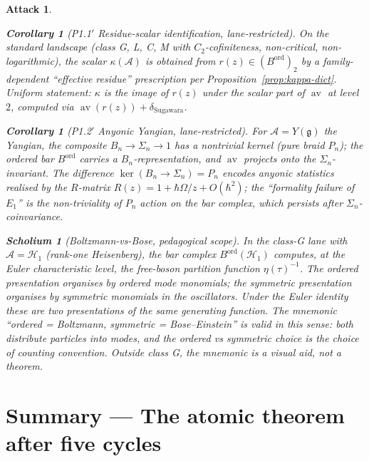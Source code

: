\documentclass[11pt]{article}
\newtheorem{corollary}[theorem]{Corollary}
\newtheorem{scholium}[theorem]{Scholium}
\newtheorem*{attack}{Attack}
\theoremstyle{definition}
\DeclareMathOperator{\av}{av}
\newcommand{\ord}{\mathrm{ord}}
\begin{document}
\begin{attack}
\begin{corollary}[P1.1$'$ Residue-scalar identification, lane-restricted]\label{cor:p1-1-final}
On the standard landscape (class G, L, C, M with $C_2$-cofiniteness,
non-critical, non-logarithmic), the scalar $\kappa(\mathcal A)$ is
obtained from $r(z) \in (B^{\ord})_2$ by a family-dependent
``effective residue'' prescription per Proposition~\ref{prop:kappa-dict}.
\emph{Uniform statement:} $\kappa$ is the image of $r(z)$ under
the scalar part of $\av$ at level $2$, computed via
$\av(r(z)) + \delta_{\mathrm{Sugawara}}$.
\end{corollary}

\begin{corollary}[P1.2$'$ Anyonic Yangian, lane-restricted]\label{cor:p1-2-final}
For $\mathcal A = Y(\mathfrak g)$ the Yangian, the composite
$B_n \to \Sigma_n \to 1$ has a nontrivial kernel (pure braid $P_n$);
the ordered bar $B^{\ord}$ carries a $B_n$-representation, and
$\av$ projects onto the $\Sigma_n$-invariant. The difference
$\ker(B_n \to \Sigma_n) = P_n$ encodes anyonic statistics realised
by the $R$-matrix $R(z) = 1 + \hbar\Omega/z + O(\hbar^2)$; the
``formality failure of $E_1$'' is the non-triviality of $P_n$ action
on the bar complex, which persists after $\Sigma_n$-coinvariance.
\end{corollary}

\begin{scholium}[Boltzmann-vs-Bose, pedagogical scope]\label{sch:boltzmann-pedagogy}
In the class-G lane with $\mathcal A = \mathcal H_1$ (rank-one Heisenberg),
the bar complex $B^{\ord}(\mathcal H_1)$ computes, at the Euler
characteristic level, the free-boson partition function
$\eta(\tau)^{-1}$. The ordered presentation organises by ordered mode
monomials; the symmetric presentation organises by symmetric monomials
in the oscillators. Under the Euler identity these are two
presentations of the same generating function. The mnemonic
``ordered = Boltzmann, symmetric = Bose--Einstein'' is valid in this
sense: both distribute particles into modes, and the ordered vs
symmetric choice is the choice of counting convention. Outside class
G, the mnemonic is a visual aid, not a theorem.
\end{scholium}

\section*{Summary --- The atomic theorem after five cycles}


\end{attack}
\end{document}
